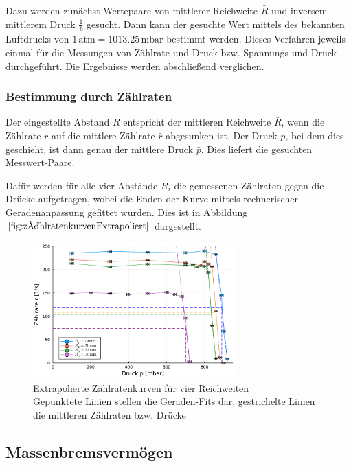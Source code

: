 \documentclass[12pt,a4paper]{scrartcl}
\numberwithin{equation}{section} %
\renewcommand{\[}{} %
\renewcommand{\]}{\noindent} %
\begin{document}
Dazu werden zunächst Wertepaare von mittlerer Reichweite \(\bar{R}\) und
inversem mittlerem Druck \(\frac{1}{\bar{p}}\) gesucht. Dann kann der
gesuchte Wert mittels des bekannten Luftdrucks von
\(1 \mathrm{\,atm} = 1013.25 \mathrm{\,mbar}\) bestimmt werden. Dieses
Verfahren jeweils einmal für die Messungen von Zählrate und Druck bzw.
Spannungs und Druck durchgeführt. Die Ergebnisse werden abschließend
verglichen.

\hypertarget{bestimmung-durch-zuxe4hlraten}{%
\subsubsection{Bestimmung durch
Zählraten}\label{bestimmung-durch-zuxe4hlraten}}

Der eingestellte Abstand \(R\) entspricht der mittleren Reichweite
\(\bar{R}\), wenn die Zählrate \(r\) auf die mittlere Zählrate
\(\bar{r}\) abgesunken ist. Der Druck \(p\), bei dem dies geschieht, ist
dann genau der mittlere Druck \(\bar{p}\). Dies liefert die gesuchten
Messwert-Paare.

Dafür werden für alle vier Abstände \(R_i\) die gemessenen Zählraten
gegen die Drücke aufgetragen, wobei die Enden der Kurve mittels
rechnerischer Geradenanpassung gefittet wurden. Dies ist in Abbildung
\(\ref{fig:zählratenkurvenExtrapoliert}\) dargestellt.

\begin{figure}[h]
	\centering
	\includegraphics[width=0.7\textwidth]{../media/B3.3/zaehlratenkurven_extrapoliert.pdf}
	\caption{Extrapolierte Zählratenkurven für vier Reichweiten\\
		Gepunktete Linien stellen die Geraden-Fits dar, gestrichelte Linien die mittleren Zählraten bzw. Drücke}
	\label{fig:zählratenkurvenExtrapoliert}
\end{figure}

\hypertarget{massenbremsvermuxf6gen}{%
\subsection{Massenbremsvermögen}\label{massenbremsvermuxf6gen}}
\end{document}
